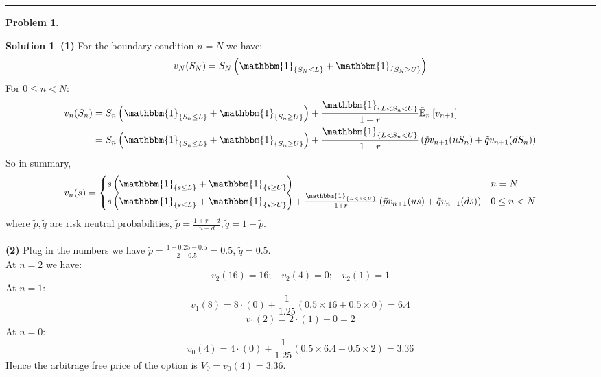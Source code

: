 \documentclass[a4paper, 10pt]{article}
\theoremstyle{definition}
\newtheorem{problem}{Problem}
\theoremstyle{hSol}
\newtheorem*{solution}{Solution}
\begin{document}
\noindent\rule{16cm}{0.4pt}
\begin{problem} 
\end{problem}
\begin{solution} \textbf{(1)} For the boundary condition $n=N$ we have:
\begin{equation}
  v_N(S_N) = S_N \left(\mathbbm{1}_{\{S_N \leq L\}} + \mathbbm{1}_{\{S_N \geq U\}}\right)
\end{equation}
For $0\leq n<N$:
\begin{equation}
  \begin{split}
      v_n(S_n) &= S_n \left(\mathbbm{1}_{\{S_n \leq L\}} + \mathbbm{1}_{\{S_n \geq U\}}\right) +\frac{\mathbbm{1}_{\{L<S_n<U\}}}{1+r} \tilde{\mathbb{E}}_n\left[v_{n+1}\right] \\
      &= S_n \left(\mathbbm{1}_{\{S_n \leq L\}} + \mathbbm{1}_{\{S_n \geq U\}}\right) +\frac{\mathbbm{1}_{\{L<S_n<U\}}}{1+r} \left(\tilde{p}v_{n+1}(uS_n)+\tilde{q}v_{n+1}(dS_n)\right)
  \end{split}
\end{equation}
So in summary,
\begin{equation}
  v_n(s) = \begin{cases}
    s \left(\mathbbm{1}_{\{s \leq L\}} + \mathbbm{1}_{\{s \geq U\}}\right) & n=N\\
    s \left(\mathbbm{1}_{\{s \leq L\}} + \mathbbm{1}_{\{s \geq U\}}\right) +\frac{\mathbbm{1}_{\{L<s<U\}}}{1+r} \left(\tilde{p}v_{n+1}(us)+\tilde{q}v_{n+1}(ds)\right) & 0\leq n< N
  \end{cases}
\end{equation}
where $\tilde{p}, \tilde{q}$ are risk neutral probabilities, $\tilde{p}=\frac{1+r-d}{u-d}, \tilde{q}=1- \tilde{p}$. \\
~\\
\textbf{(2)} Plug in the numbers we have $\tilde{p}=\frac{1+0.25-0.5}{2-0.5}=0.5$, $\tilde{q}=0.5$.\\
At $n=2$ we have:
$$
  v_2(16) = 16;~~~~v_2(4) = 0;~~~~v_2(1) = 1
$$
At $n=1$:
$$
v_1(8) = 8\cdot(0) +\frac{1}{1.25} \left(0.5\times16+0.5\times0\right) = 6.4
$$
$$
v_1(2) = 2\cdot(1) +0 = 2
$$
At $n=0$:
$$
v_0(4) = 4\cdot(0) +\frac{1}{1.25} \left(0.5\times6.4+0.5\times 2\right) = 3.36
$$
Hence the arbitrage free price of the option is $V_0 = v_0(4)=3.36$.
\end{solution}
\end{document}
